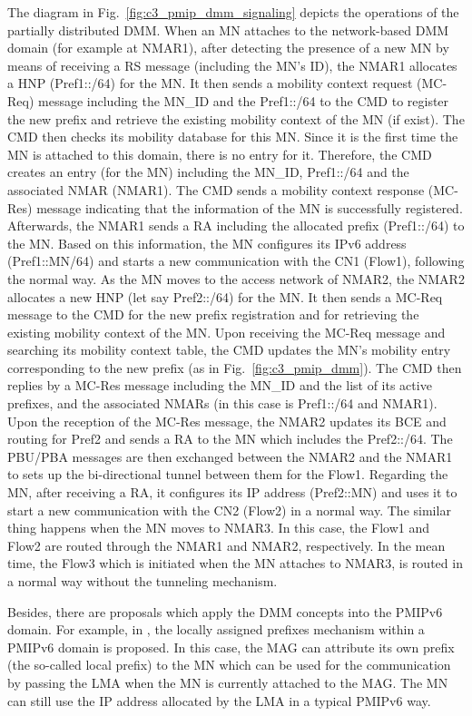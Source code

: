  The diagram in Fig.~\ref{fig:c3_pmip_dmm_signaling} depicts the operations of the partially distributed DMM. When an MN attaches to the network-based DMM domain (for example at NMAR1), after detecting the presence of a new MN by means of receiving a RS message (including the MN's ID), the NMAR1 allocates a HNP (Pref1::/64) for the MN. It then sends a mobility context request (MC-Req) message including the MN\_ID and the Pref1::/64 to the CMD to register the new prefix and retrieve the existing mobility context of the MN (if exist). The CMD then checks its mobility database for this MN. Since it is the first time the MN is attached to this domain, there is no entry for it. Therefore, the CMD creates an entry (for the MN) including the MN\_ID, Pref1::/64 and the associated NMAR (NMAR1). The CMD sends a mobility context response (MC-Res) message indicating that the information of the MN is successfully registered. Afterwards, the NMAR1 sends a RA including the allocated prefix (Pref1::/64) to the MN. Based on this information, the MN configures its IPv6 address (Pref1::MN/64) and starts a new communication with the CN1 (Flow1), following the normal way. As the MN moves to the access network of NMAR2,  the NMAR2 allocates a new HNP (let say Pref2::/64) for the MN. It then sends a MC-Req message to the CMD for the new prefix registration and for retrieving the existing mobility context of the MN. Upon receiving the MC-Req message and searching its mobility context table, the CMD updates the MN's mobility entry corresponding to the new prefix (as in Fig.~\ref{fig:c3_pmip_dmm}). The CMD then replies by a MC-Res message including the MN\_ID and the list of its active prefixes, and the associated NMARs (in this case is Pref1::/64 and NMAR1). Upon the reception of the MC-Res message, the NMAR2 updates its BCE and routing for Pref2 and sends a RA to the MN which includes the Pref2::/64. The PBU/PBA messages are then exchanged between the NMAR2 and the NMAR1 to sets up the bi-directional tunnel between them for the Flow1. Regarding the MN, after receiving a RA, it configures its IP address (Pref2::MN) and uses it to start a new communication with the CN2 (Flow2) in a normal way. The similar thing happens when the MN moves to NMAR3. In this case, the Flow1 and Flow2 are routed through the NMAR1 and NMAR2, respectively. In the mean time, the Flow3 which is initiated when the MN attaches to NMAR3, is routed in a normal way without the tunneling mechanism. 

Besides, there are proposals which apply the DMM concepts into the PMIPv6 domain. For example, in \cite{PMIP_based_DMM_Korhonen}, the locally assigned prefixes mechanism within a PMIPv6 domain is proposed. In this case, the MAG can attribute its own prefix (the so-called local prefix) to the MN which can be used for the communication by passing the LMA when the MN is currently attached to the MAG. The MN can still use the IP address allocated by the LMA in a typical PMIPv6 way.  
